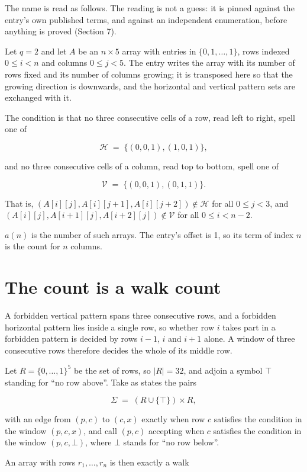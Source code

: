 \documentclass[11pt]{article}
\theoremstyle{definition}
\begin{document}
The name is read as follows. The reading is not a guess: it is pinned against the entry's own published terms, and against an independent enumeration, before anything is proved (Section 7).

Let $q = 2$ and let $A$ be an $n \times 5$ array with entries in $\{0,1,\dots,1\}$, rows indexed $0 \le i < n$ and columns $0 \le j < 5$. The entry writes the array with its number of rows fixed and its number of columns growing; it is transposed here so that the growing direction is downwards, and the horizontal and vertical pattern sets are exchanged with it.

The condition is that no three consecutive cells of a row, read left to right, spell one of

\[\mathcal{H} \;=\; \{(0,0,1), (1,0,1)\},\]

and no three consecutive cells of a column, read top to bottom, spell one of

\[\mathcal{V} \;=\; \{(0,0,1), (0,1,1)\}.\]

That is, $(A[i][j],A[i][j{+}1],A[i][j{+}2]) \notin \mathcal{H}$ for all $0 \le j < 3$, and $(A[i][j],A[i{+}1][j],A[i{+}2][j]) \notin \mathcal{V}$ for all $0 \le i < n-2$.

$a(n)$ is the number of such arrays. The entry's offset is 1, so its term of index $n$ is the count for $n$ columns.

\section{The count is a walk count}

A forbidden vertical pattern spans three consecutive rows, and a forbidden horizontal pattern lies inside a single row, so whether row $i$ takes part in a forbidden pattern is decided by rows $i-1$, $i$ and $i+1$ alone. A window of three consecutive rows therefore decides the whole of its middle row.

Let $R = \{0,\dots,1\}^{5}$ be the set of rows, so $|R| = 32$, and adjoin a symbol $\top$ standing for ``no row above''. Take as states the pairs

\[\Sigma \;=\; (R \cup \{\top\}) \times R,\]

with an edge from $(p,c)$ to $(c,x)$ exactly when row $c$ satisfies the condition in the window $(p,c,x)$, and call $(p,c)$ accepting when $c$ satisfies the condition in the window $(p,c,\bot)$, where $\bot$ stands for ``no row below''.

An array with rows $r_1,\dots,r_n$ is then exactly a walk
\end{document}
